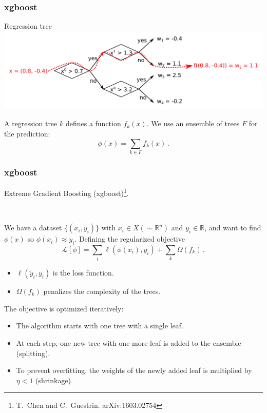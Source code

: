 \documentclass[mathserif, 10pt]{beamer}
\begin{document}
\begin{frame}
    \frametitle{xgboost}

    Regression tree
    \includegraphics[width=\textwidth]{figures/regtree.png}

    A regression tree $k$ defines a function $f_k(x)$. We use an ensemble of trees $F$ for the prediction: $$\phi(x) = \sum_{k\in F} f_k(x)\,.$$
\end{frame}

\begin{frame}
    \frametitle{xgboost}

    Extreme Gradient Boosting (xgboost)\footnote[1]{T.~Chen and C.~Guestrin. arXiv:1603.02754}.

    ~

    We have a dataset $\{(x_i, y_i)\}$ with $x_i \in X (\sim\mathbb{R}^n)$ and $y_i \in \mathbb{R}$, and want to find $\phi(x)$ so $\phi(x_i)\approx y_i$. Defining the regularized objective
    $$\mathcal{L}[\phi] = \sum_i \ell(\phi(x_i), y_i) + \sum_k \Omega(f_k)\,. $$
\begin{itemize}
    \item $\ell(\tilde{y}_i, y_i)$ is the loss function.
    \item $\Omega(f_k)$ penalizes the complexity of the trees.
\end{itemize}
The objective is optimized iteratively:
\begin{itemize}
    \item The algorithm starts with one tree with a single leaf.
    \item At each step, one new tree with one more leaf is added to the ensemble (splitting).
    \item To prevent overfitting, the weights of the newly added leaf is multiplied by $\eta < 1$ (shrinkage).
\end{itemize}
\end{frame}
\end{document}
